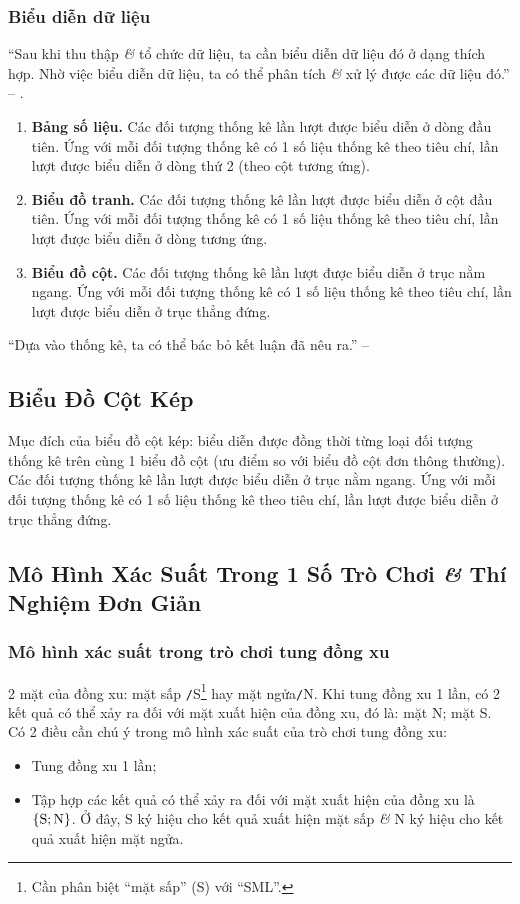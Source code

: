 \documentclass{article}
\numberwithin{equation}{section}
\begin{document}
\subsubsection{Biểu diễn dữ liệu}
``Sau khi thu thập \textit{\&} tổ chức dữ liệu, ta cần biểu diễn dữ liệu đó ở dạng thích hợp. Nhờ việc biểu diễn dữ liệu, ta có thể phân tích \textit{\&} xử lý được các dữ liệu đó.'' -- \cite[p. 6]{Thai_Anh_Dat_Ha_Loan_Nam_Quang_Toan_6_tap_2}.
\begin{enumerate}
	\item \textbf{Bảng số liệu.} Các đối tượng thống kê lần lượt được biểu diễn ở dòng đầu tiên. Ứng với mỗi đối tượng thống kê có 1 số liệu thống kê theo tiêu chí, lần lượt được biểu diễn ở dòng thứ 2 (theo cột tương ứng).
	\item \textbf{Biểu đồ tranh.} Các đối tượng thống kê lần lượt được biểu diễn ở cột đầu tiên. Ứng với mỗi đối tượng thống kê có 1 số liệu thống kê theo tiêu chí, lần lượt được biểu diễn ở dòng tương ứng.
	\item \textbf{Biểu đồ cột.} Các đối tượng thống kê lần lượt được biểu diễn ở trục nằm ngang. Ứng với mỗi đối tượng thống kê có 1 số liệu thống kê theo tiêu chí, lần lượt được biểu diễn ở trục thẳng đứng.
\end{enumerate}
``Dựa vào thống kê, ta có thể bác bỏ kết luận đã nêu ra.'' -- \cite[p. 8]{Thai_Anh_Dat_Ha_Loan_Nam_Quang_Toan_6_tap_2}

\subsection{Biểu Đồ Cột Kép}
Mục đích của biểu đồ cột kép: biểu diễn được đồng thời từng loại đối tượng thống kê trên cùng 1 biểu đồ cột (ưu điểm so với biểu đồ cột đơn thông thường). Các đối tượng thống kê lần lượt được biểu diễn ở trục nằm ngang. Ứng với mỗi đối tượng thống kê có 1 số liệu thống kê theo tiêu chí, lần lượt được biểu diễn ở trục thẳng đứng.

\subsection{Mô Hình Xác Suất Trong 1 Số Trò Chơi \textit{\&} Thí Nghiệm Đơn Giản}

\subsubsection{Mô hình xác suất trong trò chơi tung đồng xu}
2 mặt của đồng xu: mặt sấp \texttt{/}S\footnote{Cần phân biệt ``mặt sấp'' (S) với ``SML''.} hay mặt ngửa\texttt{/}N. Khi tung đồng xu 1 lần, có 2 kết quả có thể xảy ra đối với mặt xuất hiện của đồng xu, đó là: mặt N; mặt S. Có 2 điều cần chú ý trong mô hình xác suất của trò chơi tung đồng xu:
\begin{itemize}
	\item Tung đồng xu 1 lần;
	\item Tập hợp các kết quả có thể xảy ra đối với mặt xuất hiện của đồng xu là $\{\rm S;N\}$. Ở đây, S ký hiệu cho kết quả xuất hiện mặt sấp \textit{\&} N ký hiệu cho kết quả xuất hiện mặt ngửa.
\end{itemize}
\end{document}
